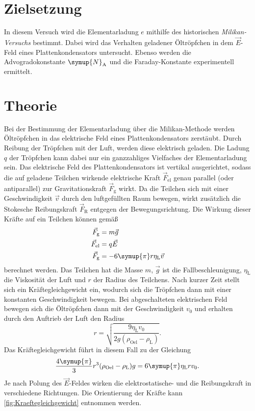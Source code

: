 \section{Zielsetzung}
\label{sec:Ziel}
In diesem Versuch wird die Elementarladung $e$ mithilfe des historischen \textit{Milikan-Versuchs} bestimmt. Dabei wird das Verhalten geladener
Öltröpfchen in dem $\vec{E}$-Feld eines Plattenkondensators untersucht. Ebenso werden die Advogradokonstante $\symup{N}_{\text{A}}$ und die Faraday-Konstante
experimentell ermittelt.

\section{Theorie}
\label{sec:Theorie}
Bei der Bestimmung der Elementarladung über die Milikan-Methode werden Öltröpfchen in das elektrische Feld eines Plattenkondensators zerstäubt.
Durch Reibung der Tröpfchen mit der Luft, werden diese elektrisch geladen. Die Ladung $q$ der Tröpfchen kann dabei nur ein ganzzahliges
Vielfaches der Elementarladung sein.
Das elektrische Feld des Plattenkondensators ist vertikal ausgerichtet, sodass die auf geladene Teilchen wirkende elektrische Kraft 
$\vec{F}_\text{el}$ genau parallel (oder antiparallel) zur Gravitationskraft $\vec{F}_\text{g}$ wirkt. Da die Teilchen sich mit einer 
Geschwindigkeit $\vec{v}$ durch den luftgefüllten Raum bewegen, wirkt zusätzlich die Stokesche Reibungskraft $\vec{F}_\text{R}$ entgegen der Bewegungsrichtung.
Die Wirkung dieser Kräfte auf ein Teilchen können gemäß
\begin{align}
    \label{eqn:Kraefte}
    \vec{F}_\text{g} &= m \vec{g} \\
    \vec{F}_\text{el} &= q \vec{E} \\
    \vec{F}_\text{g} &= -6\symup{\pi}r\eta_\text{L} \vec{v}
\end{align}
berechnet werden. Das Teilchen hat die Masse $m$, $\vec{g}$ ist die Fallbeschleunigung, $\eta_\text{L}$ die
Viskosität der Luft und $r$ der Radius des Teilchens.
Nach kurzer Zeit stellt sich ein Kräftegleichgewicht ein, wodurch sich die Tröpfchen dann mit einer konstanten Geschwindigkeit bewegen.
Bei abgeschalteten elektrischen Feld bewegen sich die Öltröpfchen dann mit der Geschwindigkeit $v_0$ und erhalten durch den Auftrieb der Luft den Radius
\begin{equation*}
    \label{eqn:Radius}
    r = \sqrt{\frac{9 \eta_\text{L}v_0}{2g(\rho_\text{Oel}- \rho_\text{L})}}.
\end{equation*}
Das Kräftegleichgewicht führt in diesem Fall zu der Gleichung
\begin{equation*}
    \frac{4\symup{\pi}}{3}r^3(\rho_\text{Oel}- \rho_\text{L})g = 6 \symup{\pi} \eta_\text{L}r v_0.
\end{equation*}
Je nach Polung des $\vec{E}$-Feldes wirken die elektrostatische- und die Reibungskraft in verschiedene Richtungen. 
Die Orientierung der Kräfte kann \autoref{fig:Kraeftegleichgewicht} entnommen werden.

